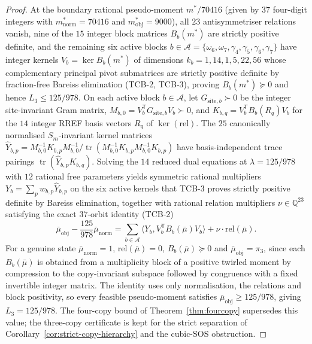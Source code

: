 \begin{proof}
At the boundary rational pseudo-moment $m^*/70416$ (given by $37$ four-digit integers with
$m^*_{\mathrm{norm}}=70416$ and $m^*_{\mathrm{obj}}=9000$), all $23$ antisymmetriser relations vanish,
nine of the $15$ integer block matrices $B_b(m^*)$ are strictly positive definite, and the remaining six
active blocks $b\in\mathcal A=\{\omega_6,\omega_7,\gamma_4,\gamma_5,\gamma_6,\gamma_7\}$ have integer
kernels $V_b=\ker B_b(m^*)$ of dimensions $k_b=1,14,1,5,22,56$ whose complementary principal pivot
submatrices are strictly positive definite by fraction-free Bareiss elimination (TCB-2, TCB-3), proving
$B_b(m^*)\succeq0$ and hence $L_3\le 125/978$. On each active block $b\in\mathcal A$, let
$G_{\mathrm{site},b}\succ0$ be the integer
site-invariant Gram matrix, $M_{b,0}=V_b^{\mathsf T}G_{\mathrm{site},b}V_b\succ0$, and
$K_{b,q}=V_b^{\mathsf T}B_b(R_q)V_b$ for the $14$ integer RREF basis vectors $R_q$ of $\ker(\mathrm{rel})$.
The $25$ canonically normalised $S_m$-invariant kernel matrices
$\widehat Y_{b,p}=M_{b,0}^{-1}K_{b,p}M_{b,0}^{-1}/\operatorname{tr}(M_{b,0}^{-1}K_{b,p}M_{b,0}^{-1}K_{b,p})$
have basis-independent trace pairings $\operatorname{tr}(\widehat Y_{b,p}K_{b,q})$. Solving the $14$
reduced dual equations at $\lambda=125/978$ with $12$ rational free parameters yields symmetric rational
multipliers $Y_b=\sum_p w_{b,p}\widehat Y_{b,p}$ on the six active kernels that TCB-3 proves strictly
positive definite by Bareiss elimination, together with rational relation multipliers $\nu\in\mathbb Q^{23}$
satisfying the exact $37$-orbit identity (TCB-2)
\[
  \bar\mu_{\mathrm{obj}}-\frac{125}{978}\bar\mu_{\mathrm{norm}}
  =\sum_{b\in\mathcal A}\bigl\langle Y_b,V_b^{\mathsf T}B_b(\bar\mu)V_b\bigr\rangle+\nu\cdot\mathrm{rel}(\bar\mu).
\]
For a genuine state $\bar\mu_{\mathrm{norm}}=1$, $\mathrm{rel}(\bar\mu)=0$, $B_b(\bar\mu)\succeq0$ and
$\bar\mu_{\mathrm{obj}}=\pi_3$, since each $B_b(\bar\mu)$ is obtained from a multiplicity block of a positive
twirled moment by compression to the copy-invariant subspace followed by congruence with a fixed invertible
integer matrix. The identity uses only normalisation, the relations and block positivity, so every feasible
pseudo-moment satisfies $\bar\mu_{\mathrm{obj}}\ge 125/978$, giving $L_3=125/978$.
The four-copy bound of Theorem~\ref{thm:fourcopy} supersedes this value; the three-copy certificate is kept
for the strict separation of Corollary~\ref{cor:strict-copy-hierarchy} and the cubic-SOS obstruction. \qedhere
\end{proof}


